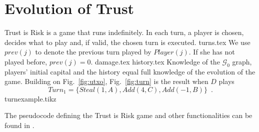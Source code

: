 \section{Evolution of Trust}
  Trust is Risk is a game that runs indefinitely. In each turn, a player is chosen, decides what to play and, if valid, the
  chosen turn is executed.
  {turns.tex}
  We use $prev\left(j\right)$ to denote the previous turn played by $Player(j)$. If she has not played before,
  $prev\left(j\right) = 0$.
  {damage.tex}
  {history.tex}
  \noindent Knowledge of the $\mathcal{G}_0$ graph, players' initial capital and the history equal full knowledge of
  the evolution of the game. Building on Fig.~\ref{fig:utxo}, Fig.~\ref{fig:turn} is the result when $D$ plays
  \begin{equation}
  \label{turnexample}
     Turn_1 = \{Steal\left(1, A\right), Add\left(4, C\right), Add\left(-1, B\right)\} \enspace.
  \end{equation}
  {turnexample.tikz}

  \noindent The pseudocode defining the Trust is Risk game and other functionalities can be found in \cite{trustisrisk}.
